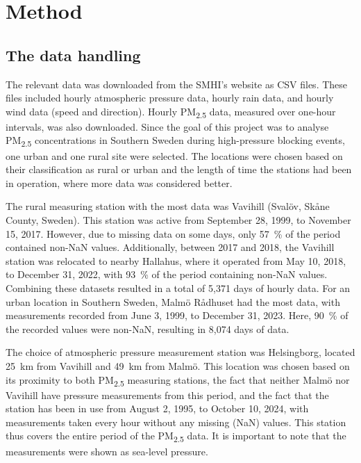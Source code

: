 \newpage
\section{Method}
\subsection{The data handling}
The relevant data was downloaded from the SMHI’s website as CSV files. These files included hourly atmospheric pressure data, hourly rain data, and hourly wind data (speed and direction). Hourly PM\textsubscript{2.5} data, measured over one-hour intervals, was also downloaded. Since the goal of this project was to analyse PM\textsubscript{2.5} concentrations in Southern Sweden during high-pressure blocking events, one urban and one rural site were selected. The locations were chosen based on their classification as rural or urban and the length of time the stations had been in operation, where more data was considered better. 

The rural measuring station with the most data was Vavihill (Svalöv, Skåne County, Sweden). This station was active from September 28, 1999, to November 15, 2017. However, due to missing data on some days, only \SI{57}{\%} of the period contained non-NaN values. Additionally, between 2017 and 2018, the Vavihill station was relocated to nearby Hallahus, where it operated from May 10, 2018, to December 31, 2022, with \SI{93}{\%} of the period containing non-NaN values. Combining these datasets resulted in a total of 5,371 days of hourly data. For an urban location in Southern Sweden, Malmö Rådhuset had the most data, with measurements recorded from June 3, 1999, to December 31, 2023. Here, \SI{90}{\%} of the recorded values were non-NaN, resulting in 8,074 days of data.

The choice of atmospheric pressure measurement station was Helsingborg, located \SI{25}{\km} from Vavihill and \SI{49}{\km} from Malmö. This location was chosen based on its proximity to both PM\textsubscript{2.5} measuring stations, the fact that neither Malmö nor Vavihill have pressure measurements from this period, and the fact that the station has been in use from August 2, 1995, to October 10, 2024, with measurements taken every hour without any missing (NaN) values. This station thus covers the entire period of the PM\textsubscript{2.5} data. It is important to note that the measurements were shown as sea-level pressure.

